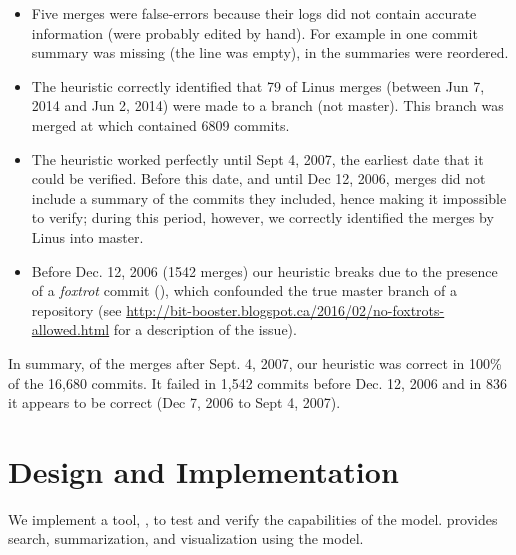 \documentclass[draft]{IEEEtran}
\begin{document}
\begin{itemize}

  \item

    Five merges were false-errors because their logs did not contain
    accurate information (were probably edited by hand). For example in
     one commit summary was missing (the line was
    empty), in  the summaries were reordered.

  \item

    The heuristic correctly identified that 79 of Linus merges (between
    Jun 7, 2014 and Jun 2, 2014) were made to a branch (not master).
    This branch was merged at  which contained 6809
    commits.

  \item

    The heuristic worked perfectly until Sept 4, 2007, the earliest date
    that it could be verified.  Before this date, and until Dec 12,
    2006, merges did not include a summary of the commits they included,
    hence making it impossible to verify; during this period, however,
    we correctly identified the merges by Linus into master.

  \item

    Before Dec. 12, 2006 (1542 merges) our heuristic breaks due to the
    presence of a \textit{foxtrot} commit (),
    which confounded the true master branch of a repository (see
    \url{http://bit-booster.blogspot.ca/2016/02/no-foxtrots-allowed.html}
    for a description of the issue).

\end{itemize}

In summary, of the merges after Sept. 4, 2007, our heuristic was correct
in 100\% of the 16,680 commits. It failed in 1,542 commits before Dec.
12, 2006 and in 836 it appears to be correct (Dec 7, 2006 to Sept 4,
2007).



\section{Design and Implementation}
\label{sec:design_and_implementation}

We implement a tool, \tool, to test and verify the capabilities of the
\mt model. \tool provides search, summarization, and
visualization using the \mt model.
\end{document}
